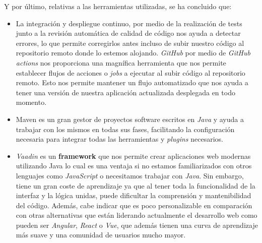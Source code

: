 Y por último, relativas a las herramientas utilizadas, se ha concluido que:

\begin{itemize}
	\item La integración y despliegue continuo, por medio de la realización de tests junto a la revisión automática de calidad de código nos ayuda a detectar errores, lo que permite corregirlos antes incluso de subir nuestro código al repositorio remoto donde lo estemos alojando. \textit{GitHub} por medio de \textit{GitHub actions} nos proporciona una magnífica herramienta que nos permite establecer flujos de acciones o \textit{jobs} a ejecutar al subir código al repositorio remoto. Esto nos permite mantener un flujo automatizado que nos ayuda a tener una versión de nuestra aplicación actualizada desplegada en todo momento. 
	\item Maven es un gran gestor de proyectos software escritos en \textit{Java} y ayuda a trabajar con los mismos en todas sus fases, facilitando la configuración necesaria para integrar todas las herramientas y \textit{plugins} necesarios.
	\item \textit{Vaadin} es un \textbf{framework} que nos permite crear aplicaciones web modernas utilizando Java lo cual es una ventaja si no estamos familiarizados con otros lenguajes como \textit{JavaScript} o necesitamos trabajar con \textit{Java}. Sin embargo, tiene un gran coste de aprendizaje ya que al tener toda la funcionalidad de la interfaz y la lógica unidas, puede dificultar la comprensión y mantenibilidad del código. Además, cabe indicar que es poco personalizable en comparación con otras alternativas que están liderando actualmente el desarrollo web como pueden ser \textit{Angular}, \textit{React} o \textit{Vue}, que además tienen una curva de aprendizaje más suave y una comunidad de usuarios mucho mayor.
\end{itemize}

\newpage
